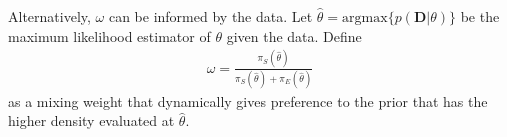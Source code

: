 \documentclass[12pt]{article}
\begin{document}
Alternatively, $\omega$ can be informed by the data. Let $\hat{\theta}=\text{argmax} \{p(\mathbf{D}|\theta)\}$ be the maximum likelihood estimator of $\theta$ given the data. Define
\begin{align}
\omega=\frac{\pi_S(\hat{\theta})}{\pi_S(\hat{\theta})+\pi_E(\hat{\theta})}
\end{align}
as a mixing weight that dynamically gives preference to the prior that has the higher density evaluated at $\hat{\theta}$.

\end{document}
